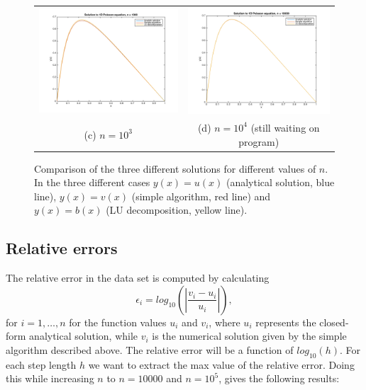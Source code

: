 \documentclass{article}
\begin{document}
\begin{multicols}{2}
\begin{figure}
\begin{center}
\begin{tabular}{cc}
 	\includegraphics[width=90mm]{../build-Project1-Desktop_Qt_5_5_0_clang_64bit-Debug/Plot_n1000.png} 	
	& \includegraphics[width=90mm]{../build-Project1-Desktop_Qt_5_5_0_clang_64bit-Debug/Plot_n10000.png} \\
	(c) $n = 10^3$ 								& (d) $n = 10^4$ (still waiting on program) \\[6pt]
	
\end{tabular}
\caption{Comparison of the three different solutions for different values of $n$. In the three different cases $y(x) = u(x)$ (analytical solution, blue line), $y(x) = v(x)$ (simple algorithm, red line) and $y(x) = b(x)$ (LU decomposition, yellow line).}\label{fig:n-values}
\end{center}
\end{figure}


\subsection{Relative errors}

The relative error in the data set is computed by calculating
\begin{equation}
   \epsilon_i=log_{10}\left(\left|\frac{v_i-u_i}
                 {u_i}\right|\right),
\end{equation}
for $i = 1, \dots, n$ for the function values $u_i$ and $v_i$, where $u_i$ represents the closed-form analytical solution, while $v_i$ is the numerical solution given by the simple algorithm described above. The relative error will be a function of $log_{10}(h)$. For each step length $h$ we want to extract the max value of the relative error. Doing this while increasing $n$ to $n=10000$ and $n=10^5$, gives the following results:


\end{multicols}
\end{document}

